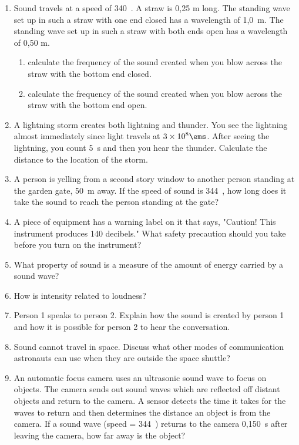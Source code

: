 \begin{enumerate}
\renewcommand{\labelenumii}{(\alph{enumii})}

\item{Sound travels at a speed of 340~\ms. A straw is 0,25 m long. The standing wave set up in such a straw with one end closed has a wavelength of 1,0~m. The standing wave set up in such a straw with both ends open has a wavelength of 0,50 m.
\begin{enumerate}
\item calculate the frequency of the sound created when you blow across the straw with the bottom end closed.
\item calculate the frequency of the sound created when you blow across the straw with the bottom end open.
\end{enumerate}}
\item{A lightning storm creates both lightning and thunder. You see the lightning almost immediately since light travels at $3\times10^{8}\ems$. After seeing the lightning, you count 5~s and then you hear the thunder. Calculate the distance to the location of the storm.}
\item{A person is yelling from a second story window to another person standing at the garden gate, 50~m away. If the speed of sound is 344~\ms, how long does it take the sound to reach the person standing at the gate?}
\item{A piece of equipment has a warning label on it that says, "Caution! This instrument produces 140 decibels." What safety precaution should you take before you turn on the instrument?}
\item{What property of sound is a measure of the amount of energy carried by a sound wave?}
\item{How is intensity related to loudness?}
\item Person 1 speaks to person 2. Explain how the sound is created by person 1 and how it is possible for person 2 to hear the conversation.
\item{Sound cannot travel in space. Discuss what other modes of communication astronauts can use when they are outside the space shuttle?}
\item{An automatic focus camera uses an ultrasonic sound wave to focus on objects. The camera sends out sound waves which are reflected off distant objects and return to the camera. A sensor detects the time it takes for the waves to return and then determines the distance an object is from the camera. If a sound wave (speed = 344~\ms) returns to the camera 0,150~s after leaving the camera, how far away is the object?}

\end{enumerate}
